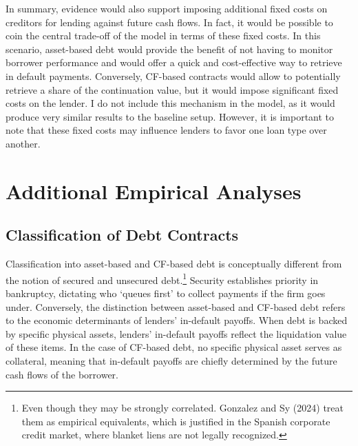 \documentclass[12pt]{article}
\begin{document}
In summary, evidence would also support imposing additional fixed costs on creditors for lending against future cash flows. In fact, it would be possible to coin the central trade-off of the model in terms of these fixed costs. In this scenario, asset-based debt would provide the benefit of not having to monitor borrower performance and would offer a quick and cost-effective way to retrieve in default payments. Conversely, CF-based contracts would allow to potentially retrieve a share of the continuation value, but it would impose significant fixed costs on the lender. I do not include this mechanism in the model, as it would produce very similar results to the baseline setup. However, it is important to note that these fixed costs may influence lenders to favor one loan type over another.

\section{Additional Empirical Analyses}

\subsection{Classification of Debt Contracts \label{sec:classification}}
Classification into asset-based and CF-based debt is conceptually different from the notion of secured and unsecured debt.\footnote{Even though they may be strongly correlated. Gonzalez and Sy (2024) treat them as empirical equivalents, which is justified in the Spanish corporate credit market, where blanket liens are not legally recognized.} Security establishes priority in bankruptcy, dictating who `queues first' to collect payments if the firm goes under. Conversely, the distinction between asset-based and CF-based debt refers to the economic determinants of lenders' in-default payoffs. When debt is backed by specific physical assets, lenders' in-default payoffs reflect the liquidation value of these items. In the case of CF-based debt, no specific physical asset serves as collateral, meaning that in-default payoffs are chiefly determined by the future cash flows of the borrower. 
\end{document}
